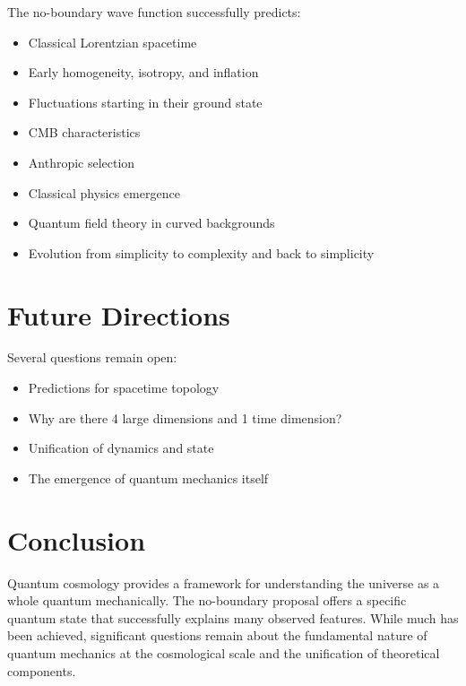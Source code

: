 \documentclass[12pt,a4paper]{article}
\begin{document}
The no-boundary wave function successfully predicts:
\begin{itemize}
    \item Classical Lorentzian spacetime
    \item Early homogeneity, isotropy, and inflation
    \item Fluctuations starting in their ground state
    \item CMB characteristics
    \item Anthropic selection
    \item Classical physics emergence
    \item Quantum field theory in curved backgrounds
    \item Evolution from simplicity to complexity and back to simplicity
\end{itemize}

\section{Future Directions}

Several questions remain open:
\begin{itemize}
    \item Predictions for spacetime topology
    \item Why are there 4 large dimensions and 1 time dimension?
    \item Unification of dynamics and state
    \item The emergence of quantum mechanics itself
\end{itemize}

\section{Conclusion}

Quantum cosmology provides a framework for understanding the universe as a whole quantum mechanically. The no-boundary proposal offers a specific quantum state that successfully explains many observed features. While much has been achieved, significant questions remain about the fundamental nature of quantum mechanics at the cosmological scale and the unification of theoretical components.
\end{document}
